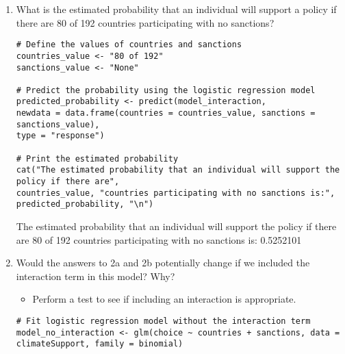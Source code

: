 \documentclass[12pt,letterpaper]{article}
\begin{document}
\begin{enumerate}
\begin{enumerate}
	\begin{lstlisting}
# Extract coefficient for the interaction term between countries and sanctions
interaction_coef <- coef(model_interaction)["countries.L:sanctions.L"]

# Interpretation of the coefficient
cat("The coefficient for the interaction term between countries and sanctions is:", interaction_coef, "\n\n")
cat("Interpretation:\n")
cat("For each one-unit increase in sanctions (from 5% to 15%), the odds of supporting the policy\n")
cat("are multiplied by exp(", interaction_coef, ") = ", exp(interaction_coef), "\n\n")
	\end{lstlisting}
	
For each one unit increase in sanctions, from 5 to 15 percentage, the odds of supporting the policy are multiplied by exp -0.001754016 = 0.9982475.

This implies that increasing sanctions from 5 to 15 percentage is associated with a slight decrease in the odds of supporting the policy. However, the effect is minimal, indicating that the change in odds is not substantial.

		\item
		What is the estimated probability that an individual will support a policy if there are 80 of 192 countries participating with no sanctions? 
		
	\begin{lstlisting}
# Define the values of countries and sanctions
countries_value <- "80 of 192"
sanctions_value <- "None"

# Predict the probability using the logistic regression model
predicted_probability <- predict(model_interaction, 
newdata = data.frame(countries = countries_value, sanctions = sanctions_value),
type = "response")

# Print the estimated probability
cat("The estimated probability that an individual will support the policy if there are",
countries_value, "countries participating with no sanctions is:", predicted_probability, "\n")
	\end{lstlisting}
The estimated probability that an individual will support the policy if there are 80 of 192 countries participating with no sanctions is: 0.5252101 
	\newpage			
		\item
		Would the answers to 2a and 2b potentially change if we included the interaction term in this model? Why? 
		\begin{itemize}
			\item Perform a test to see if including an interaction is appropriate.
		\end{itemize}
	\begin{lstlisting}
# Fit logistic regression model without the interaction term
model_no_interaction <- glm(choice ~ countries + sanctions, data = climateSupport, family = binomial)


\end{lstlisting}
\end{enumerate}
\end{enumerate}
\end{document}
